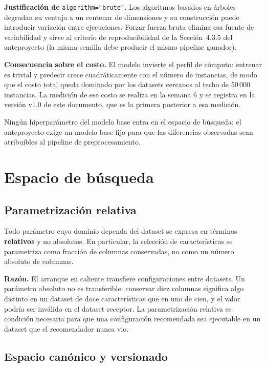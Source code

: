 \documentclass[11pt,letterpaper]{article}
\begin{document}
\textbf{Justificación de} \texttt{algorithm="brute"}\textbf{.} Los algoritmos
basados en árboles degradan su ventaja a un centenar de dimensiones y su
construcción puede introducir variación entre ejecuciones. Forzar fuerza bruta
elimina esa fuente de variabilidad y sirve al criterio de reproducibilidad de la
Sección~4.3.5 del anteproyecto (la misma semilla debe producir el mismo pipeline
ganador).

\textbf{Consecuencia sobre el costo.} El modelo invierte el perfil de cómputo:
entrenar es trivial y predecir crece cuadráticamente con el número de instancias,
de modo que el costo total queda dominado por los datasets cercanos al techo de
50\,000 instancias. La medición de ese costo se realiza en la semana 6 y se
registra en la versión v1.0 de este documento, que es la primera posterior a esa
medición.

Ningún hiperparámetro del modelo base entra en el espacio de búsqueda: el
anteproyecto exige un modelo base fijo para que las diferencias observadas sean
atribuibles al pipeline de preprocesamiento.

\section{Espacio de búsqueda}
\label{sec:espacio}

\subsection{Parametrización relativa}

Todo parámetro cuyo dominio dependa del dataset se expresa en términos
\textbf{relativos} y no absolutos. En particular, la selección de
características se parametriza como fracción de columnas conservadas, no como un
número absoluto de columnas.

\textbf{Razón.} El arranque en caliente transfiere configuraciones entre
datasets. Un parámetro absoluto no es transferible: conservar diez columnas
significa algo distinto en un dataset de doce características que en uno de cien,
y el valor podría ser inválido en el dataset receptor. La parametrización
relativa es condición necesaria para que una configuración recomendada sea
ejecutable en un dataset que el recomendador nunca vio.

\subsection{Espacio canónico y versionado}
\end{document}
